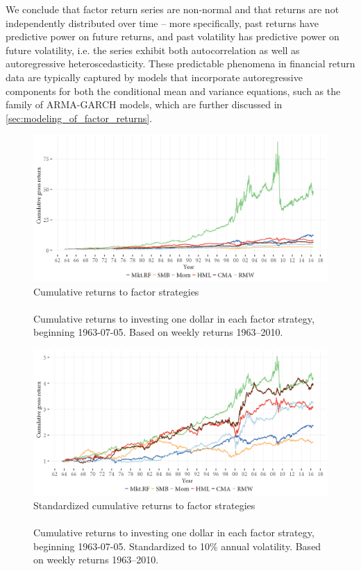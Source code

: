 We conclude that factor return series are non-normal and that returns are not independently distributed over time -- more specifically, past returns have predictive power on future returns, and past volatility has predictive power on future volatility, i.e. the series exhibit both autocorrelation as well as autoregressive heteroscedasticity. These predictable phenomena in financial return data are typically captured by models that incorporate autoregressive components for both the conditional mean and variance equations, such as the family of ARMA-GARCH models, which are further discussed in \autoref{sec:modeling_of_factor_returns}.
\begin{figure}[htbp]
  \centering
  \footnotesize
  \renewcommand{\arraystretch}{1.2}
  \caption{Cumulative returns to factor strategies \\ \quad \\ 
  Cumulative returns to investing one dollar in each factor strategy, beginning 1963-07-05. Based on weekly returns 1963--2010.}
  \label{fig:cumret}
  \includegraphics[scale=1]{graphics/cumretPlot.png}  
\end{figure}
\begin{figure}[htbp]
  \centering
  \footnotesize
  \renewcommand{\arraystretch}{1.2}
  \caption{Standardized cumulative returns to factor strategies \\ \quad \\ 
  Cumulative returns to investing one dollar in each factor strategy, beginning 1963-07-05. Standardized to 10\% annual volatility. Based on weekly returns 1963--2010.}
  \label{fig:cumretstd}
  \includegraphics[scale=1]{graphics/cumretStdPlot.png}  
\end{figure}

